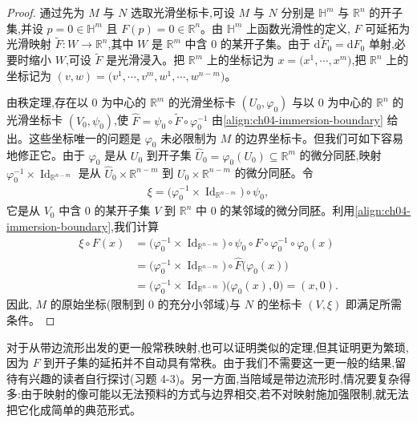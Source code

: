 \documentclass[../../main.tex]{subfiles}
\begin{document}
\begin{proof}
通过先为 $M$ 与 $N$ 选取光滑坐标卡,可设 $M$ 与 $N$ 分别是 $\mathbb{H}^m$ 与 $\mathbb{R}^n$ 的开子集,并设 $p=0\in\mathbb{H}^m$ 且 $F(p)=0\in\mathbb{R}^n$。由 $\mathbb{H}^m$ 上函数光滑性的定义, $F$ 可延拓为光滑映射 $\widetilde{F}:W\to\mathbb{R}^n$,其中 $W$ 是 $\mathbb{R}^m$ 中含 $0$ 的某开子集。由于 $\mathrm{d}\widetilde{F}_0=\mathrm{d}F_0$ 单射,必要时缩小 $W$,可设 $\widetilde{F}$ 是光滑浸入。把 $\mathbb{R}^m$ 上的坐标记为 $x=\bigl(x^1,\cdots ,x^m\bigr)$,把 $\mathbb{R}^n$ 上的坐标记为 $(v,w)=\bigl(v^1,\cdots ,v^m,w^1,\cdots ,w^{n-m}\bigr)$。

由秩定理,存在以 $0$ 为中心的 $\mathbb{R}^m$ 的光滑坐标卡 $(U_0,\varphi_0)$ 与以 $0$ 为中心的 $\mathbb{R}^n$ 的光滑坐标卡 $(V_0,\psi_0)$,使 $\widehat{F}=\psi_0\circ\widetilde{F}\circ\varphi_0^{-1}$ 由\eqref{align:ch04-immersion-boundary} 给出。这些坐标唯一的问题是 $\varphi_0$ 未必限制为 $M$ 的边界坐标卡。但我们可如下容易地修正它。由于 $\varphi_0$ 是从 $U_0$ 到开子集 $\widehat{U}_0=\varphi_0(U_0)\subseteq\mathbb{R}^m$ 的微分同胚,映射 $\varphi_0^{-1}\times\operatorname{Id}_{\mathbb{R}^{n-m}}$ 是从 $\widehat{U}_0\times\mathbb{R}^{n-m}$ 到 $U_0\times\mathbb{R}^{n-m}$ 的微分同胚。令
\begin{align*}
\xi=\bigl(\varphi_0^{-1}\times\operatorname{Id}_{\mathbb{R}^{n-m}}\bigr)\circ\psi_0,
\end{align*}
它是从 $V_0$ 中含 $0$ 的某开子集 $V$ 到 $\mathbb{R}^n$ 中 $0$ 的某邻域的微分同胚。利用\eqref{align:ch04-immersion-boundary},我们计算
\begin{align*}
\xi\circ F(x)
&=\bigl(\varphi_0^{-1}\times\operatorname{Id}_{\mathbb{R}^{n-m}}\bigr)\circ\psi_0\circ F\circ\varphi_0^{-1}\circ\varphi_0(x)\\
&=\bigl(\varphi_0^{-1}\times\operatorname{Id}_{\mathbb{R}^{n-m}}\bigr)\circ\widehat{F}\bigl(\varphi_0(x)\bigr)\\
&=\bigl(\varphi_0^{-1}\times\operatorname{Id}_{\mathbb{R}^{n-m}}\bigr)\bigl(\varphi_0(x),0\bigr)=(x,0).
\end{align*}
因此, $M$ 的原始坐标(限制到 $0$ 的充分小邻域)与 $N$ 的坐标卡 $(V,\xi)$ 即满足所需条件。
\end{proof}

对于从带边流形出发的更一般常秩映射,也可以证明类似的定理,但其证明更为繁琐,因为 $F$ 到开子集的延拓并不自动具有常秩。由于我们不需要这一更一般的结果,留待有兴趣的读者自行探讨(习题 4-3)。另一方面,当陪域是带边流形时,情况要复杂得多:由于映射的像可能以无法预料的方式与边界相交,若不对映射施加强限制,就无法把它化成简单的典范形式。
\end{document}
